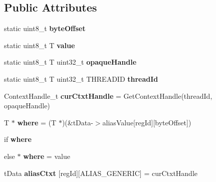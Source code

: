 \subsection*{Public Attributes}
\begin{DoxyCompactItemize}
\item 
\hypertarget{structHandleAliasRegisters_a490d7cd2cb4493baa103ef0bbc893040}{static uint8\-\_\-t {\bfseries byte\-Offset}}\label{structHandleAliasRegisters_a490d7cd2cb4493baa103ef0bbc893040}

\item 
\hypertarget{structHandleAliasRegisters_aec70b43a163d5663e5b451f2c43e1504}{static uint8\-\_\-t T {\bfseries value}}\label{structHandleAliasRegisters_aec70b43a163d5663e5b451f2c43e1504}

\item 
\hypertarget{structHandleAliasRegisters_a3c688f2fea30443f08b9d18ec65d1cf2}{static uint8\-\_\-t T uint32\-\_\-t {\bfseries opaque\-Handle}}\label{structHandleAliasRegisters_a3c688f2fea30443f08b9d18ec65d1cf2}

\item 
static uint8\-\_\-t T uint32\-\_\-t T\-H\-R\-E\-A\-D\-I\-D {\bfseries thread\-Id}
\item 
\hypertarget{structHandleAliasRegisters_a2353d797fd7c85e570cc3a313ab2d792}{Context\-Handle\-\_\-t {\bfseries cur\-Ctxt\-Handle} = Get\-Context\-Handle(thread\-Id, opaque\-Handle)}\label{structHandleAliasRegisters_a2353d797fd7c85e570cc3a313ab2d792}

\item 
\hypertarget{structHandleAliasRegisters_a1a18781dae34c7eeb124836894e98f13}{T $\ast$ {\bfseries where} = (T $\ast$)(\&t\-Data-\/$>$alias\-Value\mbox{[}reg\-Id\mbox{]}\mbox{[}byte\-Offset\mbox{]})}\label{structHandleAliasRegisters_a1a18781dae34c7eeb124836894e98f13}

\item 
if {\bfseries where}
\item 
\hypertarget{structHandleAliasRegisters_a7ce9b1fbeef1eeda44f3a7e2f47a0459}{else $\ast$ {\bfseries where} = value}\label{structHandleAliasRegisters_a7ce9b1fbeef1eeda44f3a7e2f47a0459}

\item 
\hypertarget{structHandleAliasRegisters_aa0311188dc7d4371b2937d3a905b6b64}{t\-Data {\bfseries alias\-Ctxt} \mbox{[}reg\-Id\mbox{]}\mbox{[}A\-L\-I\-A\-S\-\_\-\-G\-E\-N\-E\-R\-I\-C\mbox{]} = cur\-Ctxt\-Handle}\label{structHandleAliasRegisters_aa0311188dc7d4371b2937d3a905b6b64}


\end{DoxyCompactItemize}
